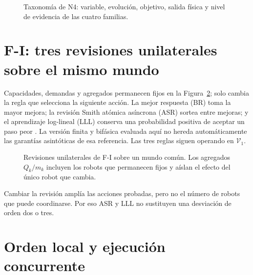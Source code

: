 \begin{figure}[H]
\centering
\scalebox{.70}{}
\caption{Taxonomía de N4: variable, evolución, objetivo, salida física y nivel
de evidencia de las cuatro familias.}
\label{fig:n4-family-taxonomy}
\viuownsource
\end{figure}
\vspace{-3mm}

\clearpage

\section*{F-I: tres revisiones unilaterales sobre el mismo mundo}

Capacidades, demandas y agregados permanecen fijos en la
Figura~\ref{fig:n4-atlas-fi}; solo cambia la regla que selecciona la siguiente
acción. La mejor respuesta (BR) toma la mayor mejora; la revisión Smith atómica
asíncrona (ASR) sortea entre mejoras; y el aprendizaje log-lineal (LLL) conserva
una probabilidad positiva de aceptar un paso peor
\parencite{mardenShamma2012LogLinear}. La versión finita y bifásica evaluada
aquí no hereda automáticamente las garantías asintóticas de esa referencia. Las
tres reglas siguen operando en $\mathcal V_1$.

\begin{figure}[H]
\centering
\scalebox{.98}{}
\caption{Revisiones unilaterales de F-I sobre un mundo común. Los agregados
$Q_k/m_k$ incluyen los robots que permanecen fijos y aíslan el efecto del único
robot que cambia.}
\label{fig:n4-atlas-fi}
\viuownsource
\end{figure}

Cambiar la revisión amplía las acciones probadas, pero no el número de robots
que puede coordinarse. Por eso ASR y LLL no sustituyen una desviación de orden
dos o tres.

\clearpage

\section*{Orden local y ejecución concurrente}

